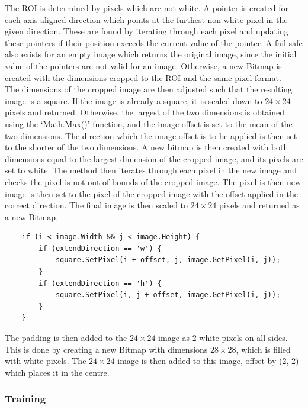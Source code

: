 \documentclass{article}
\begin{document}
The ROI is determined by pixels which are not white. A pointer is created for each axis-aligned direction which points at the furthest non-white pixel in the given direction. These are found by iterating through each pixel and updating these pointers if their position exceeds the current value of the pointer. A fail-safe also exists for an empty image which returns the original image, since the initial value of the pointers are not valid for an image. Otherwise, a new Bitmap is created with the dimensions cropped to the ROI and the same pixel format. \\

The dimensions of the cropped image are then adjusted such that the resulting image is a square. If the image is already a square, it is scaled down to \(24\times 24\) pixels and returned. Otherwise, the largest of the two dimensions is obtained using the `Math.Max()' function, and the image offset is set to the mean of the two dimensions. The direction which the image offset is to be applied is then set to the shorter of the two dimensions. A new bitmap is then created with both dimensions equal to the largest dimension of the cropped image, and its pixels are set to white. The method then iterates through each pixel in the new image and checks the pixel is not out of bounds of the cropped image. The pixel is then new image is then set to the pixel of the cropped image with the offset applied in the correct direction. The final image is then scaled to \(24\times 24\) pixels and returned as a new Bitmap.

\begin{verbatim}
    if (i < image.Width && j < image.Height) {
        if (extendDirection == 'w') {
            square.SetPixel(i + offset, j, image.GetPixel(i, j));
        }
        if (extendDirection == 'h') {
            square.SetPixel(i, j + offset, image.GetPixel(i, j));
        }
    }
\end{verbatim}

The padding is then added to the \(24\times 24\) image as 2 white pixels on all sides. This is done by creating a new Bitmap with dimensions \(28\times 28\), which is filled with white pixels. The \(24\times 24\) image is then added to this image, offset by (2, 2) which places it in the centre.

\subsubsection{Training}
\end{document}
